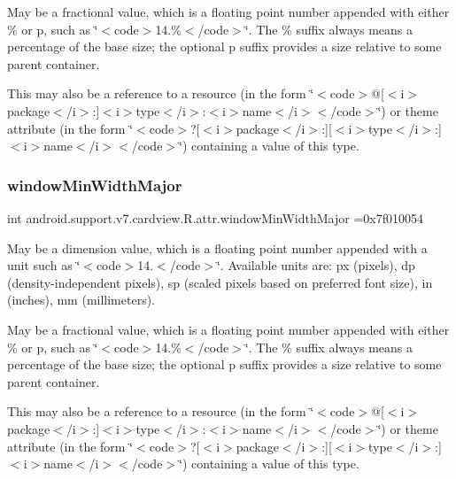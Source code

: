 May be a fractional value, which is a floating point number appended with either \% or p, such as \char`\"{}$<$code$>$14.\%$<$/code$>$\char`\"{}. The \% suffix always means a percentage of the base size; the optional p suffix provides a size relative to some parent container. 

This may also be a reference to a resource (in the form \char`\"{}$<$code$>$@\mbox{[}$<$i$>$package$<$/i$>$\+:\mbox{]}$<$i$>$type$<$/i$>$\+:$<$i$>$name$<$/i$>$$<$/code$>$\char`\"{}) or theme attribute (in the form \char`\"{}$<$code$>$?\mbox{[}$<$i$>$package$<$/i$>$\+:\mbox{]}\mbox{[}$<$i$>$type$<$/i$>$\+:\mbox{]}$<$i$>$name$<$/i$>$$<$/code$>$\char`\"{}) containing a value of this type. \mbox{\label{classandroid_1_1support_1_1v7_1_1cardview_1_1R_1_1attr_a2ecfc1a56d5e9664224bb3d917db75b6}} 
\subsubsection{\texorpdfstring{window\+Min\+Width\+Major}{windowMinWidthMajor}}
{\footnotesize\ttfamily int android.\+support.\+v7.\+cardview.\+R.\+attr.\+window\+Min\+Width\+Major =0x7f010054\hspace{0.3cm}{\ttfamily [static]}}

May be a dimension value, which is a floating point number appended with a unit such as \char`\"{}$<$code$>$14.\+5sp$<$/code$>$\char`\"{}. Available units are\+: px (pixels), dp (density-\/independent pixels), sp (scaled pixels based on preferred font size), in (inches), mm (millimeters). 

May be a fractional value, which is a floating point number appended with either \% or p, such as \char`\"{}$<$code$>$14.\%$<$/code$>$\char`\"{}. The \% suffix always means a percentage of the base size; the optional p suffix provides a size relative to some parent container. 

This may also be a reference to a resource (in the form \char`\"{}$<$code$>$@\mbox{[}$<$i$>$package$<$/i$>$\+:\mbox{]}$<$i$>$type$<$/i$>$\+:$<$i$>$name$<$/i$>$$<$/code$>$\char`\"{}) or theme attribute (in the form \char`\"{}$<$code$>$?\mbox{[}$<$i$>$package$<$/i$>$\+:\mbox{]}\mbox{[}$<$i$>$type$<$/i$>$\+:\mbox{]}$<$i$>$name$<$/i$>$$<$/code$>$\char`\"{}) containing a value of this type. \mbox{\label{classandroid_1_1support_1_1v7_1_1cardview_1_1R_1_1attr_a85ca0290c40bde370780acb11b48134e}} 
